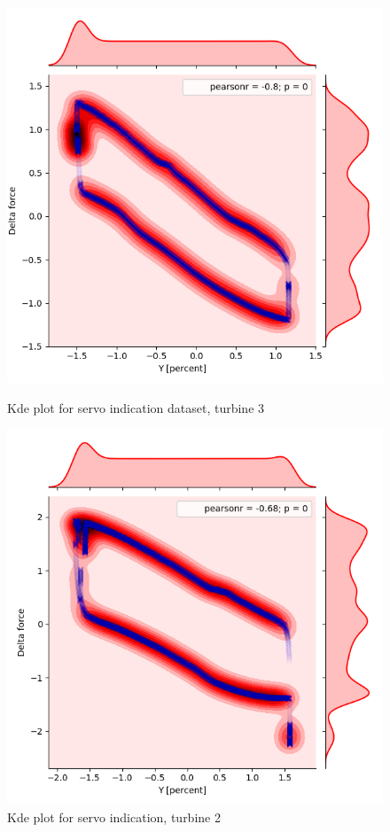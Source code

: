 \begin{figure}
    \begin{minipage}[b]{0.5\linewidth}
        \centering
        \includegraphics[width=1\linewidth]{figures/data/kdePlot_servoindication_A3.png}
        \caption{Kde plot for servo indication dataset, turbine 3}

    \end{minipage}
    \hfill
    \begin{minipage}[b]{0.5\linewidth}
        \centering
        \includegraphics[width=1\linewidth]{figures/data/kdePlot_servoindication_A2.png}
        \caption{Kde plot for servo indication, turbine 2}
    \end{minipage}


\end{figure}

